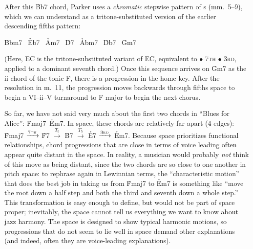 After this \h{Bb7} chord, Parker uses a \emph{chromatic} stepwise pattern of \tf{}s
(mm.~5--9), which we can understand as a tritone-substituted version of the
earlier descending fifths pattern:

\begin{center}
  \h{Bbm7} \TFarrow\ \h{Eb7} \ECTarrow\
  \h{Am7}  \TFarrow\ \h{D7}  \ECTarrow\
  \h{Abm7} \TFarrow\ \h{Db7} \ECTarrow\
  \h{Gm7}
\end{center}

\noindent (Here, EC is the tritone-substituted variant of EC,
equivalent to \tft $\bullet$ \textsc{7th} $\bullet$ \textsc{3rd}, applied to a
dominant seventh chord.) Once this sequence arrives on \h{Gm7} as the ii chord
of the tonic F, there is a \tfo progression in the home key. After the
resolution in m.~11, the progression moves backwards through fifths space to
begin a VI--ii--V turnaround to F major to begin the next chorus.\fn{tft-8}

So far, we have not said very much about the first two chords in ``Blues for
Alice'': \h{Fmaj7}--\h{Em7}. In \tf space, these chords are relatively far
apart (4 edges): \h{Fmaj7} $\xrightarrow{\text{\textsc{7th}}}$ \h{F7} $\xrightarrow{T_6}$
\h{B7} $\xrightarrow{T_5}$ \h{E7} $\xrightarrow{\text{\textsc{3rd}}}$ \h{Em7}.
Because \tf space prioritizes functional relationships, chord progressions
that are close in terms of voice leading often appear quite distant in the
space. In reality, a musician would probably \emph{not} think of this move as
being distant, since the two chords are so close to one another
in pitch space: to rephrase again in Lewinnian terms, the ``characteristic
motion'' that does the best job in taking us from \h{Fmaj7} to \h{Em7} is
something like ``move the root down a half step and both the third and seventh
down a whole step.'' This transformation is easy enough to define, but would
not be part of \tf space proper; inevitably, the space cannot tell us
everything we want to know about jazz harmony. The space is designed to show
typical harmonic motions, so progressions that do not seem to lie well in \tf
space demand other explanations (and indeed, often they are voice-leading
explanations).




